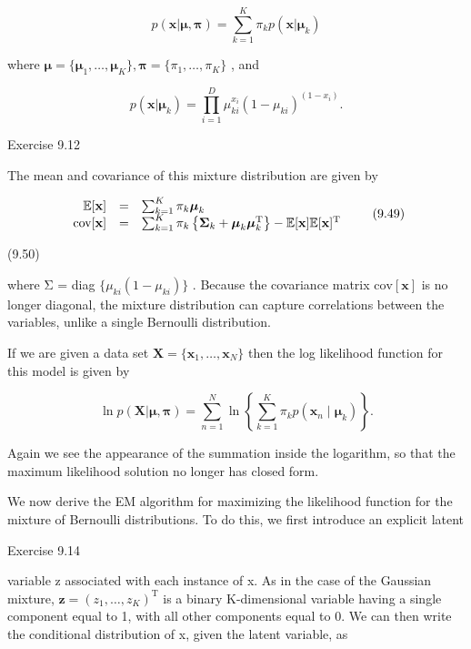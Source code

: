 \documentclass[
  10
]{article}
\begin{document}
\[
p (\mathbf {x} | \boldsymbol {\mu}, \boldsymbol {\pi}) = \sum_ {k = 1} ^ {K} \pi_ {k} p (\mathbf {x} | \boldsymbol {\mu} _ {k})\tag{9.47}
\]

where
\(\pmb { \mu } = \{ \pmb { \mu } _ { 1 } , \ldots , \pmb { \mu } _ { K } \} , \pmb { \pi } = \{ \pi _ { 1 } , \ldots , \pi _ { K } \}\)
, and

\[
p (\mathbf {x} | \boldsymbol {\mu} _ {k}) = \prod_ {i = 1} ^ {D} \mu_ {k i} ^ {x _ {i}} (1 - \mu_ {k i}) ^ {(1 - x _ {i})}.\tag{9.48}
\]

Exercise 9.12

The mean and covariance of this mixture distribution are given by

\[
\begin{array}{r c l} \mathbb {E} [ \mathbf {x} ] & = & \sum_ {k = 1} ^ {K} \pi_ {k} \boldsymbol {\mu} _ {k} \\ \operatorname{cov} [ \mathbf {x} ] & = & \sum_ {k = 1} ^ {K} \pi_ {k} \left\{\boldsymbol {\Sigma} _ {k} + \boldsymbol {\mu} _ {k} \boldsymbol {\mu} _ {k} ^ {\mathrm{T}} \right\} - \mathbb {E} [ \mathbf {x} ] \mathbb {E} [ \mathbf {x} ] ^ {\mathrm{T}} \end{array}\tag{9.49}
\]

(9.50)

where Σ = diag \(\{ \mu _ { k i } ( 1 - \mu _ { k i } ) \}\) . Because
the covariance matrix \(\mathrm { c o v } [ \mathbf { x } ]\) is no
longer diagonal, the mixture distribution can capture correlations
between the variables, unlike a single Bernoulli distribution.

If we are given a data set
\(\mathbf { X } = \{ \mathbf { x } _ { 1 } , \ldots , \mathbf { x } _ { N } \}\)
then the log likelihood function for this model is given by

\[
\ln p (\mathbf {X} | \boldsymbol {\mu}, \boldsymbol {\pi}) = \sum_ {n = 1} ^ {N} \ln \left\{\sum_ {k = 1} ^ {K} \pi_ {k} p \left(\mathbf {x} _ {n} \mid \boldsymbol {\mu} _ {k}\right) \right\}.\tag{9.51}
\]

Again we see the appearance of the summation inside the logarithm, so
that the maximum likelihood solution no longer has closed form.

We now derive the EM algorithm for maximizing the likelihood function
for the mixture of Bernoulli distributions. To do this, we first
introduce an explicit latent

Exercise 9.14

variable z associated with each instance of x. As in the case of the
Gaussian mixture,
\(\mathbf { z } = ( z _ { 1 } , \dots , z _ { K } ) ^ { \mathrm { T } }\)
is a binary K-dimensional variable having a single component equal to 1,
with all other components equal to 0. We can then write the conditional
distribution of x, given the latent variable, as
\end{document}
